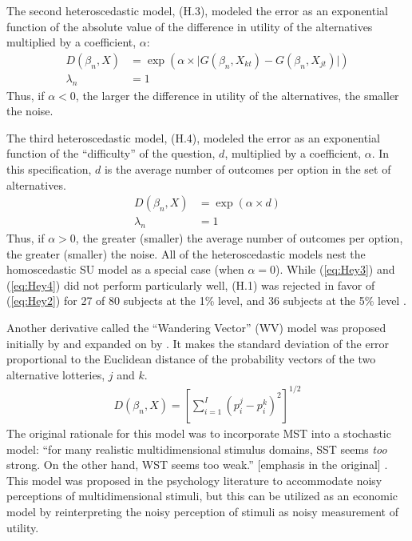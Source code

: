 The second heteroscedastic model, (H.3), modeled the error as an exponential function of the absolute value of the difference in utility of the alternatives multiplied by a coefficient, $\alpha$:
\begin{align*}
	\tag{H.3}
	\label{eq:Hey3}
	D(\beta_n,X) &= \exp\left(\alpha \times \lvert G(\beta_n,X_{kt}) - G(\beta_n,X_{jt}) \rvert\right)\\
	\lambda_n &= 1
\end{align*}
Thus, if $\alpha < 0$, the larger the difference in utility of the alternatives, the smaller the noise.

The third heteroscedastic model, (H.4), modeled the error as an exponential function of the \enquote{difficulty} of the question, $d$, multiplied by a coefficient, $\alpha$.
In this specification, $d$ is the average number of outcomes per option in the set of alternatives.
\begin{align*}
	\tag{H.4}
	\label{eq:Hey4}
	D(\beta_n,X) &= \exp(\alpha \times d)\\
	\lambda_n &= 1
\end{align*}
Thus, if $\alpha > 0$, the greater (smaller) the average number of outcomes per option, the greater (smaller) the noise.
All of the heteroscedastic models nest the homoscedastic SU model as a special case (when $\alpha=0$).
While (\ref{eq:Hey3}) and (\ref{eq:Hey4}) did not perform particularly well, (H.1) was rejected in favor of (\ref{eq:Hey2}) for 27 of 80 subjects at the 1\% level, and 36 subjects at the 5\% level \parencite*[639]{Hey1995a}.

Another derivative called the \enquote{Wandering Vector} (WV) model was proposed initially by \textcite{Carroll1980} and expanded on by \textcite{Carroll1991}.
It makes the standard deviation of the error proportional to the Euclidean distance of the probability vectors of the two alternative lotteries, $j$ and $k$.
\begin{align*}
	D(\beta_n,X) = \left[  \sum_{i=1}^I (p_i^j - p_i^k)^2 \right]^{1/2}
\end{align*}
The original rationale for this model was to incorporate MST into a stochastic model: \enquote{for many realistic multidimensional stimulus domains, SST seems \textit{too} strong.
On the other hand, WST seems too weak.} [emphasis in the original] \parencite*[343]{Carroll1991}.
This model was proposed in the psychology literature to accommodate noisy perceptions of multidimensional stimuli, but this can be utilized as an economic model by reinterpreting the noisy perception of stimuli as noisy measurement of utility.

